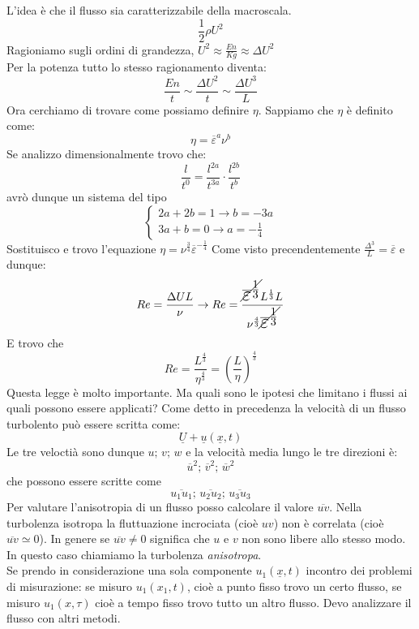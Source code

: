 L'idea è che il flusso sia caratterizzabile della macroscala.
\[ 
  \frac{1}{2}\rho U ^2
\]
Ragioniamo sugli ordini di grandezza, $ U ^2 \approx \frac{En}{Kg} \approx \Delta U ^2 $\\
Per la potenza tutto lo stesso ragionamento diventa:
\[
  \frac{En}{t} \sim \frac{\Delta U ^2}{t} \sim \frac{\Delta U ^3}{L}
\]
Ora cerchiamo di trovare come possiamo definire $ \eta $. Sappiamo che $ \eta $ è definito come:
\[
	\eta =  \overline{\varepsilon} ^{a} \nu^{b}   
\]
Se analizzo dimensionalmente trovo che:
\[
	\frac{l}{t^0}=\frac{l^{2a}}{t^{3a}} \cdot \frac{l ^{2b}}{t ^{b}}  
\]
avrò dunque un sistema del tipo
\begin{equation*}
  \begin{cases}
    2a+2b = 1 \rightarrow b = -3a\\
    3a + b = 0 \rightarrow a = -\frac{1}{4}
  \end{cases}
\end{equation*}
Sostituisco e trovo l'equazione $ \eta=\nu ^{\frac{3}{4}} \overline{\varepsilon} ^{-\frac{1}{4}} $
Come visto precendentemente $ \frac{\Delta ^{3}}{L} = \overline{\varepsilon} $ e dunque:
\[
	\LARGE
	Re = \frac{\Delta U L}{\nu} \to Re = \frac{\cancel{\overline{\varepsilon}^{\frac{1}{3}}}L ^{\frac{1}{3}}L}{\nu ^{\frac{4}{3}}\cancel{\overline{\varepsilon}^{\frac{1}{3}}}}
\]
E trovo che 
\[
	Re = \frac{L ^{\frac{4}{3}}}{\eta ^{\frac{4}{3}}} = \left( \frac{L}{\eta} \right)^{\frac{4}{3}}
\]
Questa legge è molto importante.
Ma quali sono le ipotesi che limitano i flussi ai quali possono essere applicati?
Come detto in precedenza la velocità di un flusso turbolento può essere scritta come:
\[
	\underline{U} + \underline{u}\left( \underline{x} ,t \right)
\]
Le tre veloctià sono dunque $ u;\, v;\,w $ e la velocità media lungo le tre direzioni è:
\[
  \overline{u}^2;\,\overline{v}^2;\,\overline{w}^2
\]
che possono essere scritte come 
\begin{equation*}
	\overline{u_1u_1};\,\overline{u_2u_2};\,\overline{u_3u_3}
\end{equation*}
Per valutare l'anisotropia di un flusso posso calcolare il valore $ \overline{uv} $.
Nella turbolenza isotropa la fluttuazione incrociata (cioè $ uv $) non è correlata (cioè $ \overline{uv} \simeq 0 $).
In genere se $ \overline{uv} \neq 0$ significa che $ u $ e $ v $ non sono libere allo stesso modo. 
In questo caso chiamiamo la turbolenza \emph{anisotropa}.\\
Se prendo in considerazione una sola componente $ u_1 \left(\underline{x},t\right)  $ incontro dei problemi di misurazione:
se misuro $ u_1 \left( x_1,t \right) $, cioè a punto fisso trovo un certo flusso, se misuro $ u_1 \left( x, \tau \right) $ cioè a tempo fisso trovo tutto un altro flusso.
Devo analizzare il flusso con altri metodi.\\


